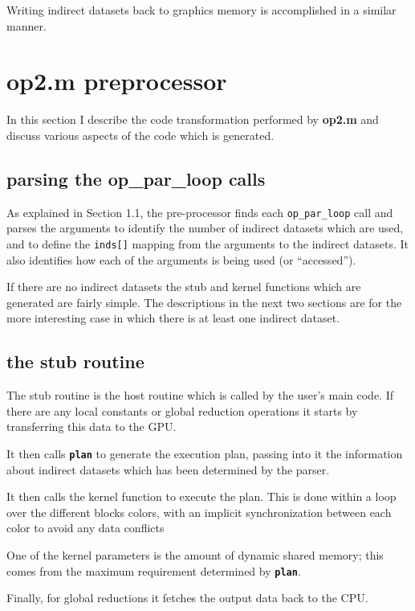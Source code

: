 \documentclass[12pt]{article}
\begin{document}
Writing indirect datasets back to graphics memory is accomplished in a 
similar manner.


\section{op2.m preprocessor}

In this section I describe the code transformation performed by
{\bf op2.m} and discuss various aspects of the code which is generated.

\subsection{parsing the op\_par\_loop calls}

As explained in Section 1.1, the pre-processor finds each 
{\tt op\_par\_loop} call 
and parses the arguments to identify the number of indirect 
datasets which are used, and to define the {\tt inds[]} mapping 
from the arguments to the indirect datasets.  It also identifies 
how each of the arguments is being used (or ``accessed'').

If there are no indirect datasets the stub and kernel functions
which are generated are fairly simple.  The descriptions in the next 
two sections are for the more interesting case in which there is
at least one indirect dataset.

\subsection{the stub routine}

The stub routine is the host routine which is called by the user's 
main code.  If there are any local constants or global reduction 
operations it starts by transferring this data to the GPU.

It then calls {\tt \bf plan} to generate the execution plan, 
passing into it the information about indirect datasets which 
has been determined by the parser.

It then calls the kernel function to execute the plan.  This is 
done within a loop over the different blocks colors, with an
implicit synchronization between each color to avoid any data 
conflicts

One of the kernel parameters is the amount of dynamic shared 
memory; this comes from the maximum requirement determined 
by {\tt \bf plan}.

Finally, for global reductions it fetches the output data back
to the CPU.
\end{document}
